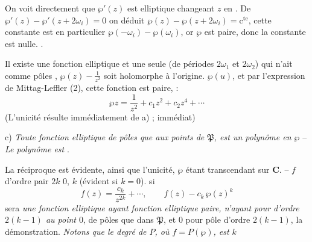 \documentclass[11pt,a4paper]{article}
\begin{document}
On voit directement que $\wp'(z)$ est elliptique \struck{\ill{}} changeant
$z$ en .
De $\wp'(z) - \wp'(z+2\omega_i) = 0$ on déduit
$\wp(z) - \wp(z+2\omega_i) = \text{c}^{\text{te}}$, cette constante est
en particulier  $\wp(-\omega_i) - \wp(\omega_i)$,
or $\wp$ est paire, donc la constante est nulle. \ill{} \ill{}.

Il existe une fonction elliptique et une seule (de périodes $2\omega_1$ et
$2\omega_2$) qui n'ait comme pôles 
,
  $\wp(z) - \frac{1}{z^2}$
soit holomorphe  à l'origine. \struck{\ill{} \ill{} \ill{}
\ill{} \ill{} \ill{}}  $\wp(u)$, et  par
l'expression de Mittag-Leffler (2), cette fonction est paire,
 :
\[
\wp z = \frac{1}{z^2} + c_1 z^2 + c_2 z^4 + \cdots
\]
(L'unicité résulte immédiatement de a) ; 
immédiat)

c) \emph{Toute fonction elliptique}  \emph{
de pôles que aux points de $\mathfrak{P}$, est un polynôme en $\wp$ } -- \emph{Le polynôme est
}.

La réciproque est évidente, ainsi que l'unicité, $\wp$ étant transcendant
sur $\mathbf{C}$. -- $f$  d'ordre pair $2k$  $0$,  $k$ (évident si
$k=0$). 
  si
\[
f(z) = \frac{c_k}{z^{2k}} + \cdots, \qquad f(z) - c_k\,\wp(z)^k
\]
sera
\emph{une fonction elliptique ayant \ill{} \ill{} \ill{} fonction elliptique
paire, n'ayant pour \ill{} \ill{} d'ordre $2(k-1)$ au point $0$}, \ill{} \ill{}
\ill{} \ill{} de pôles que dans $\mathfrak{P}$, et $0$ pour pôle d'ordre
 $2(k-1)$,  la
démonstration.
\emph{Notons que le degré de $P$, où $f = P(\wp)$, est $k$}
\end{document}
